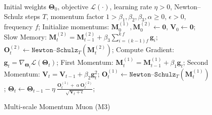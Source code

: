 \documentclass{article}
\begin{document}
{\begin{figure}
\vspace*{-11ex}
    \begin{minipage}{0.45\textwidth}
        \begin{algorithm}[H]
            \caption{Multi-scale Momentum Muon (M3) }\label{alg:M3}
            \begin{algorithmic}[1]
            \Require Initial weights $\boldsymbol{\Theta}_0$, objective $\mathcal{L}(\cdot)$, learning rate $\eta > 0$, Newton–Schulz steps $T$, momentum factor $1 > \beta_1, \beta_2, \beta_3, \alpha \geq 0$, $\epsilon>0$, frequency $f$; 
            \State Initialize momentums: $\boldsymbol{M}^{(1)}_{0}, \boldsymbol{M}^{(2)}_{0}  \leftarrow \mathbf{0}$, $\boldsymbol{V}_{0} \leftarrow \mathbf{0}$;
                \State Slow Memory: $\boldsymbol{M}^{(2)}_{t} = \boldsymbol{M}^{(2)}_{t-1} + \beta_3 \sum_{i = (k-1)f}^{k\:f} \boldsymbol{g}_i$; 
                \State $\boldsymbol{O}^{(2)}_t \leftarrow \texttt{Newton–Schulz}_{T}\left( \boldsymbol{M}^{(2)}_{t}\right)$;
                    \State Compute Gradient: $\boldsymbol{g}_t = \nabla_{\boldsymbol{\Theta}_t} \mathcal{L}(\boldsymbol{\Theta}_t)$;
                    \State First Momentum: $\boldsymbol{M}^{(1)}_{t} = \boldsymbol{M}^{(1)}_{t-1} + \beta_1 \boldsymbol{g}_t$;
                    \State Second Momentum: $\boldsymbol{V}_{t} = \boldsymbol{V}_{t-1} + \beta_2 \boldsymbol{g}^{2}_t$;
                    \State $\boldsymbol{O}^{(1)}_t \leftarrow \texttt{Newton–Schulz}_{T}\left( \boldsymbol{M}^{(1)}_{t}\right)$;
                    \State $\boldsymbol{\Theta}_t \leftarrow \boldsymbol{\Theta}_{t-1} - \eta \: \frac{\boldsymbol{O}^{(1)}_t + \:\alpha \:\boldsymbol{O}^{(2)}_t}{\sqrt{ \boldsymbol{V}_{t}+ \epsilon}}$;
                \EndFor
            \EndFor
            \end{algorithmic}
        \end{algorithm}
    \end{minipage}
    \vspace{-4ex}
\end{figure}

}
\end{document}
